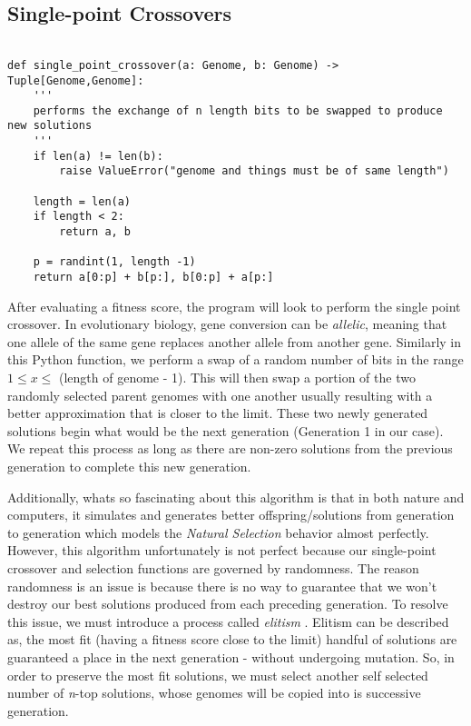 \subsection{Single-point Crossovers} 

\begin{lstlisting}

def single_point_crossover(a: Genome, b: Genome) -> Tuple[Genome,Genome]:   
    '''
    performs the exchange of n length bits to be swapped to produce new solutions
    '''
    if len(a) != len(b):
        raise ValueError("genome and things must be of same length")
    
    length = len(a)
    if length < 2:
        return a, b

    p = randint(1, length -1)
    return a[0:p] + b[p:], b[0:p] + a[p:]

\end{lstlisting}

After evaluating a fitness score, the program will look to perform the single point crossover. In evolutionary biology, gene conversion can be \emph{allelic}, meaning that one allele of the same gene replaces another allele from another gene. Similarly in this Python function, we perform a swap of a random number of bits in the range $1 \leq x \leq$ (length of genome - 1). This will then swap a portion of the two randomly selected parent genomes with one another usually resulting with a better approximation that is closer to the limit. These two newly generated solutions begin what would be the next generation (Generation 1 in our case). We repeat this process as long as there are non-zero solutions from the previous generation to complete this new generation.

Additionally, whats so fascinating about this algorithm is that in both nature and computers, it simulates and generates better offspring/solutions from generation to generation which models the \emph{Natural Selection} behavior almost perfectly. However, this algorithm unfortunately is not perfect because our single-point crossover and selection functions are governed by randomness. The reason randomness is an issue is because there is no way to guarantee that we won't destroy our best solutions produced from each preceding generation. To resolve this issue, we must introduce a process called \emph{elitism} \cite{Ahn}. Elitism can be described as, the most fit (having a fitness score close to the limit) handful of solutions are guaranteed a place in the next generation - without undergoing mutation. So, in order to preserve the most fit solutions, we must select another self selected number of \emph{n}-top solutions, whose genomes will be copied into is successive generation.

